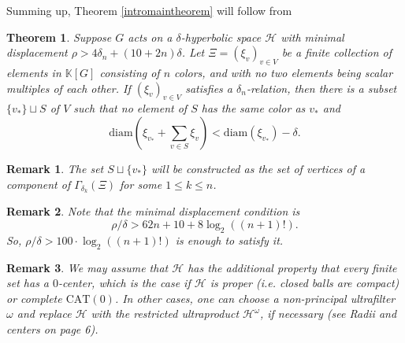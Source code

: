 \documentclass[11pt,letterpaper]{amsart}
\newtheorem{theorem}{Theorem}
\newtheorem*{remark}{Remark}
\begin{document}


Summing up, Theorem \ref{intromaintheorem} will follow from



\begin{theorem} \label{maintheorem}
Suppose $G$ acts on a $\delta$-hyperbolic space $\mathcal H$ with minimal displacement $\rho>4\delta_n+(10+2n)\delta$. Let $\Xi=(\xi_v)_{v\in V}$ be a finite collection of elements in $\mathbb K[G]$ consisting of $n$ colors, and with no two elements being scalar multiples of each other. If $(\xi_v)_{v\in V}$ satisfies a $\delta_n$-relation,
then there is a subset $\{v_*\}\sqcup S$ of $V$ such that no element of $S$ has the same color as $v_*$ and
$$
\mathrm{diam}\left(\xi_{v_*}+\sum_{v\in S}\xi_v\right)< \mathrm{diam}(\xi_{v_*})-\delta. 
$$
\end{theorem}
\begin{remark}
The set $S\sqcup\{v_*\}$ will be constructed as the set of vertices of a component of $\Gamma_{\delta_k}(\Xi)$ for some $1\leq k\leq n$. 
\end{remark}
\begin{remark}
Note that the minimal displacement condition is 
$$
\rho/\delta>62n+10+8\log_2((n+1)!).
$$
So, $\rho/\delta>100\cdot\log_2 ((n+1)!)$ is enough to satisfy it. 
\end{remark}
\begin{remark}
We may assume that $\mathcal H$ has the additional property that every finite set has a $0$-center, which is the case if $\mathcal H$ is proper (i.e. closed balls are compact) or complete $\mathrm{CAT}(0)$. In other cases, one can choose a non-principal ultrafilter $\omega$ and replace $\mathcal H$ with the restricted ultraproduct $\mathcal H^{\omega}$, if necessary (see {\it Radii and centers} on page 6).
\end{remark}
\end{document}
